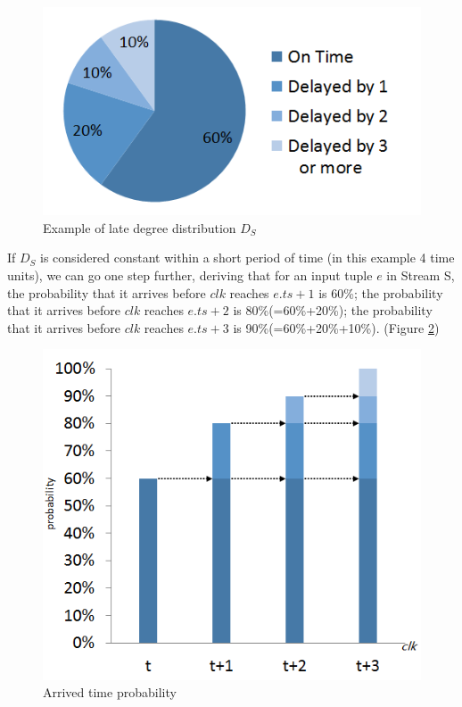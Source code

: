 \documentclass[a4paper, 11pt, twoside]{report}
\begin{document}
%
%
%

\begin{figure}[h]
\centering
\includegraphics[scale=0.75]{late_degree_distribution}
\caption{Example of late degree distribution $D_S$\label{fig:late_degree_distribution}}
\end{figure}

If $D_S$ is considered constant within a short period of time (in this example 4 time units), we can go one step further, deriving that for an input tuple $e$ in Stream S, the probability that it arrives before $clk$ reaches $e.ts+1$ is 60\%; the probability that it arrives before $clk$ reaches $e.ts+2$ is 80\%(=60\%+20\%); the probability that it arrives before $clk$ reaches $e.ts+3$ is 90\%(=60\%+20\%+10\%). (Figure \ref{fig:total-arrived-tuples})\\

\begin{figure}[h]
\centering
\includegraphics[scale=0.75]{total-arrived-tuples}
\caption{Arrived time probability\label{fig:total-arrived-tuples}}
\end{figure}
\end{document}
